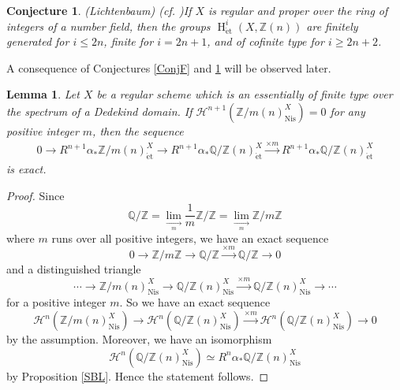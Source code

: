 \documentclass{article}
\newtheorem{lem}[thm]{\indent \sc Lemma}
\newtheorem{con}[thm]{\indent \sc Conjecture}
\newcommand{\et}{\mathrm{\acute{e}t}}
\newcommand{\Nis}{\mathrm{Nis}}
\newcommand{\HO}{\operatorname{H}}
\begin{document}
%
\begin{con}\upshape(Lichtenbaum) (cf. \cite[p.1625, Conjecture 4.12]{Ge19})\label{ConjL}
If $X$ is regular and proper over the ring of integers of a number field, then the 
groups 
$\HO^{i}_{\et}(X, \mathbb{Z}(n))$
are finitely generated for $i\leq 2n$,
finite for $i=2n+1$,
and of cofinite type for $i\geq 2n+2$.
\end{con}
%

A consequence of Conjectures \ref{ConjF} and \ref{ConjL} will be
observed later.

%
\begin{lem}\upshape\label{Asvan}
Let $X$ be a regular scheme 
which is an essentially of finite type over
the spectrum of a Dedekind domain. If
$\mathcal{H}^{n+1}(\mathbb{Z}/m(n)_{\Nis}^{X})=0$
for any positive integer $m$, 
then the sequence
%
\begin{align*}
0\to   
R^{n+1}\alpha_{*}\mathbb{Z}/m(n)_{\et}^{X}
\to
R^{n+1}\alpha_{*}\mathbb{Q}/\mathbb{Z}(n)_{\et}^{X}
\xrightarrow{\times m}
R^{n+1}\alpha_{*}\mathbb{Q}/\mathbb{Z}(n)_{\et}^{X}
\end{align*}
%
is exact.
\end{lem}
%

%
\begin{proof}\upshape
Since
%
\begin{equation*}
\mathbb{Q}/\mathbb{Z}
=
\displaystyle\lim_{\xrightarrow[m]{}}
\frac{1}{m}\mathbb{Z}/\mathbb{Z}
=
\displaystyle\lim_{\xrightarrow[m]{}}
\mathbb{Z}/m\mathbb{Z}
\end{equation*}
%
where $m$ runs over all positive integers,
we have an exact sequence
%
\begin{equation*}
0\to 
\mathbb{Z}/m\mathbb{Z}
\to
\mathbb{Q}/\mathbb{Z}
\xrightarrow{\times m}
\mathbb{Q}/\mathbb{Z}
\to 
0
\end{equation*}
%
and a distinguished triangle
%
\begin{equation*}
\cdots\to 
\mathbb{Z}/m(n)^{X}_{\Nis}
\to
\mathbb{Q}/\mathbb{Z}(n)^{X}_{\Nis}
\xrightarrow{\times m}
\mathbb{Q}/\mathbb{Z}(n)^{X}_{\Nis}
\to 
\cdots
\end{equation*}
%
for a positive integer $m$. So we have an exact sequence
%
\begin{equation*}
\mathcal{H}^{n}(\mathbb{Z}/m(n)_{\Nis}^{X})
\to 
\mathcal{H}^{n}(\mathbb{Q}/\mathbb{Z}(n)_{\Nis}^{X})
\xrightarrow{\times m}
\mathcal{H}^{n}(\mathbb{Q}/\mathbb{Z}(n)_{\Nis}^{X})
\to 
0
\end{equation*}
%
by the assumption. Moreover, we have an isomorphism
%
\begin{equation*}
\mathcal{H}^{n}(
\mathbb{Q}/\mathbb{Z}(n)_{\Nis}^{X}
)
\simeq 
R^{n}\alpha_{*}
\mathbb{Q}/\mathbb{Z}(n)_{\Nis}^{X}
\end{equation*}
%
by Proposition \ref{SBL}. Hence the statement follows.
\end{proof}
%
\end{document}
